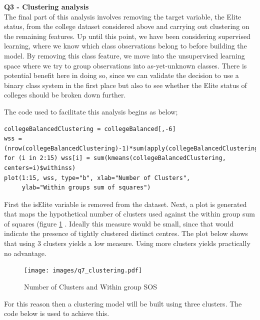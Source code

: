 \documentclass[paper=a4, fontsize=11pt]{scrartcl} %
\begin{document}
{\noindent \bf \large Q3 - Clustering analysis}\\
{The final part of this analysis involves removing the target variable, the Elite status, from the college dataset considered above and carrying out clustering on the remaining features. Up until this point, we have been considering supervised learning, where we know which class observations belong to before building the model.
By removing this class feature, we move into the unsupervised learning space where we try to group observations into as-yet-unknown classes. There is potential benefit here in doing so, since we can validate the decision to use a binary class system in the first place but also to see whether the Elite status of colleges should be broken down further. }
{\par The code used to facilitate this analysis begins as below; }
\begin{lstlisting}
collegeBalancedClustering = collegeBalanced[,-6]
wss = (nrow(collegeBalancedClustering)-1)*sum(apply(collegeBalancedClustering,2,var))
for (i in 2:15) wss[i] = sum(kmeans(collegeBalancedClustering, centers=i)$withinss)
plot(1:15, wss, type="b", xlab="Number of Clusters",
     ylab="Within groups sum of squares")
\end{lstlisting}
{First the isElite variable is removed from the dataset. Next, a plot is generated that maps the hypothetical number of clusters used against the within group sum of squares (figure \ref{Number_of_Clusters_and_within_group_SOS} . Ideally this measure would be small, since that would indicate the presence of tightly clustered distinct centres. The plot below shows that using 3 clusters yields a low measure. Using more clusters yields practically no advantage.}
\begin{figure}
\centering
\texttt{[image: images/q7\_clustering.pdf]}
\caption{Number of Clusters and Within group SOS} 
\label{Number_of_Clusters_and_within_group_SOS}
\end{figure}
{\par For this reason then a clustering model will be built using three clusters. The code below is used to achieve this. }
\end{document}
